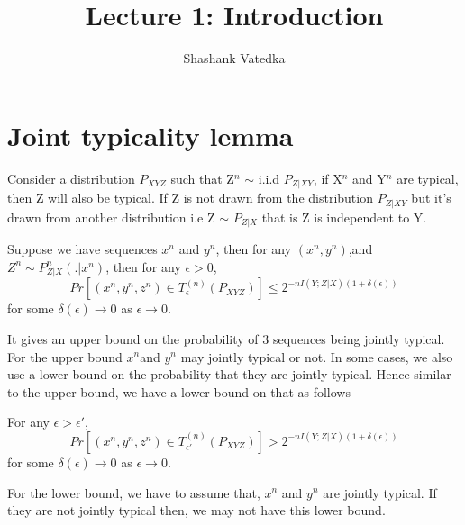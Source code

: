 \documentclass{article}
\title{Lecture 1: Introduction}
\author{Shashank Vatedka}
\begin{document}
	
	
	
	\section{Joint typicality lemma}

Consider a distribution $P_{XYZ}$ such that Z$^n$ $\sim$  i.i.d $P_{Z|XY}$, if X$^n$ and Y$^n$ are typical, then Z will also be typical. If Z is not drawn from the distribution $P_{Z|XY}$ but it's drawn from another distribution i.e Z $\sim$ $P_{Z|X}$ that is Z is independent to Y.\\
\begin{lemma} Suppose we have sequences $x^{n}$ and $y^{n}$, then for any $\left( x^n, y^n \right)$,and $Z^n \sim P^{n}_{Z|X}\left( .|x^n\right)$,  then for any $\epsilon >0$,
\begin{equation}
	Pr \left[ \left(x^n, y^n,z^n \right) \in T^{(n)}_{\epsilon}  \left( P_{XYZ}\right)\right] \leq 2^{-nI\left( Y; Z|X\right) \left(1 + \delta(\epsilon)\right)} 
\end{equation}
for some $\delta(\epsilon) \rightarrow 0$ as $\epsilon \rightarrow 0$.\\
\end{lemma}
It gives an upper bound on the probability of 3 sequences being jointly typical. For the upper bound  $ x^n$and $ y^n$ may jointly typical or not. In some cases, we also use a lower bound on the probability that they are jointly typical. Hence similar to the upper bound, we have a lower bound on that as follows\\
\begin{lemma} For any $\epsilon > \epsilon'$,
\begin{equation}
	Pr \left[ \left(x^n, y^n,z^n \right) \in T^{(n)}_{\epsilon'}  \left( P_{XYZ}\right)\right] > 2^{-nI\left( Y;Z|X\right) \left(1 + \delta(\epsilon)\right)} 
\end{equation}
for some $\delta(\epsilon) \rightarrow 0$ as $\epsilon \rightarrow 0$.\\
\end{lemma} For the lower bound, we have to assume that, $x^n$ and $y^n$ are jointly typical. If they are not jointly typical then, we may not have this lower bound.
\end{document}
